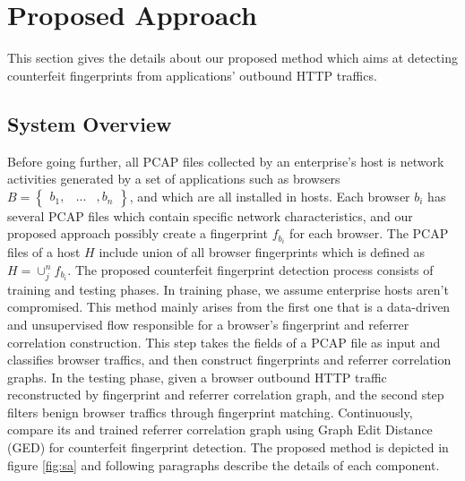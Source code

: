 \section{Proposed Approach}

This section gives the details about our proposed method which aims at detecting counterfeit fingerprints from applications' outbound HTTP traffics. 

\subsection{System Overview}

Before going further, all PCAP files collected by an enterprise's host is network activities generated by a set of applications such as browsers $B = \begin{Bmatrix} b_{1}, & ... & , b_{n} \end{Bmatrix}$, and which are all installed in hosts. Each browser $b_{i}$ has several PCAP files which contain specific network characteristics, and our proposed approach possibly create a fingerprint $f_{b_{i}}$ for each browser. The PCAP files of a host $H$ include union of all browser fingerprints which is defined as $H = \cup^{n}_{j} f_{b_{i}}$. The proposed counterfeit fingerprint detection process consists of training and testing phases. In training phase, we assume enterprise hosts aren't compromised. This method mainly arises from the first one that is a data-driven and unsupervised flow responsible for a browser's fingerprint \cite{bortolameotti2017decanter} and referrer correlation construction. This step takes the fields of a PCAP file as input and classifies browser traffics, and then construct fingerprints and referrer correlation graphs. In the testing phase, given a browser outbound HTTP traffic reconstructed by fingerprint and referrer correlation graph, and the second step filters benign browser traffics through fingerprint matching. Continuously, compare its and trained referrer correlation graph using Graph Edit Distance (GED) for counterfeit fingerprint detection. The proposed method is depicted in figure \ref{fig:sa} and following paragraphs describe the details of each component.

